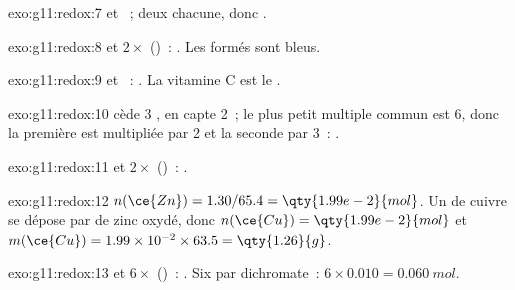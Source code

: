 \begin{solution}{exo:g11:redox:7}
 et ~; deux
 chacune, donc .
\end{solution}

\begin{solution}{exo:g11:redox:8}
 et $2\times$ ()~:
. Les   formés sont
bleus.
\end{solution}

\begin{solution}{exo:g11:redox:9}
 et ~:
. La vitamine C est le .
\end{solution}

\begin{solution}{exo:g11:redox:10}
 cède 3 ,  en
capte 2~; le plus petit multiple commun est 6, donc la première est
multipliée par 2 et la seconde par 3~: .
\end{solution}

\begin{solution}{exo:g11:redox:11}
 et $2\times$ ()~:
.
\end{solution}

\begin{solution}{exo:g11:redox:12}
$n(\ce{Zn}) = 1.30/65.4 = \qty{1.99e-2}{mol}$. Un  de cuivre se
dépose par  de zinc oxydé, donc $n(\ce{Cu}) = \qty{1.99e-2}{mol}$
et $m(\ce{Cu}) = 1.99\times 10^{-2} \times 63.5 = \qty{1.26}{g}$.
\end{solution}

\begin{solution}{exo:g11:redox:13}
 et
$6\times$ ()~:
.
Six  par  dichromate~: $6 \times 0.010 = \qty{0.060}{mol}$.
\end{solution}

